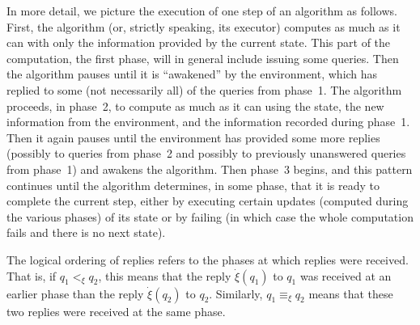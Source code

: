 \documentclass{LMCS}
\theoremstyle{definition}
\newcommand{\ans}{\dot}
\begin{document}
In more detail, we picture the execution of one step of an algorithm
as follows.  First, the algorithm (or, strictly speaking, its
executor) computes as much as it can with only the information
provided by the current state.  This part of the computation, the
first phase, will in general include issuing some queries.  Then the
algorithm pauses until it is ``awakened'' by the environment, which
has replied to some (not necessarily all) of the queries from phase~1.
The algorithm proceeds, in phase~2, to compute as much as it can using
the state, the new information from the environment, and
the information recorded during phase~1.  Then it again pauses
until the environment has provided some more replies (possibly to
queries from phase~2 and possibly to previously unanswered queries
from phase~1) and awakens the algorithm.  Then phase~3 begins, and
this pattern continues until the algorithm determines, in some
phase, that it is ready to complete the current step, either by
executing certain updates (computed during the various phases) of
its state or by failing (in which case the whole computation fails
and there is no next state).

The logical ordering of replies refers to the phases at which replies
were received.  That is, if $q_1<_\xi q_2$, this means that the reply
${\ans\xi}(q_1)$ to $q_1$ was received at an earlier phase than the reply
${\ans\xi}(q_2)$ to $q_2$.  Similarly, $q_1\equiv_\xi q_2$ means that these two
replies were received at the same phase.
\end{document}
